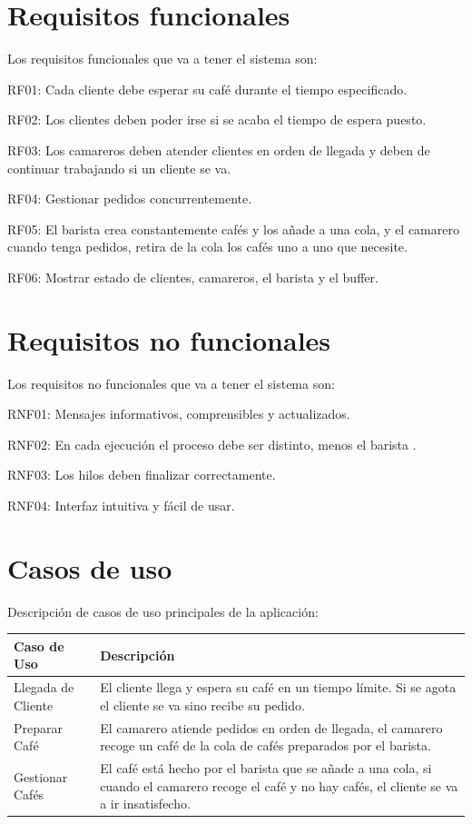 \documentclass[a4paper,12pt]{article}
\begin{document}
\vspace{1cm}
\section{Requisitos funcionales}
Los requisitos funcionales que va a tener el sistema son:

RF01: Cada cliente debe esperar su café durante el tiempo especificado.

RF02: Los clientes deben poder irse si se acaba el tiempo de espera puesto.

RF03: Los camareros deben atender clientes en orden de llegada y deben de continuar trabajando si un cliente se va.

RF04: Gestionar pedidos concurrentemente.

RF05: El barista crea constantemente cafés y los añade a una cola, y el camarero cuando tenga pedidos, retira de la cola los cafés uno a uno que necesite.

RF06: Mostrar estado de clientes, camareros, el barista y el buffer.

\vspace{1cm}
\section{Requisitos no funcionales}
Los requisitos no funcionales que va a tener el sistema son:

RNF01: Mensajes informativos, comprensibles y actualizados.

RNF02: En cada ejecución el proceso debe ser distinto, menos el barista .

RNF03: Los hilos deben finalizar correctamente.

RNF04: Interfaz intuitiva y fácil de usar.

\vspace{2cm}
\section{Casos de uso}
Descripción de casos de uso principales de la aplicación:

\begin{tabular}{|l|p{10cm}|}
    \hline
    Caso de Uso & Descripción \\ \hline
    Llegada de Cliente & El cliente llega y espera su café en un tiempo límite. Si se agota el cliente se va sino recibe su pedido. \\ \hline
    Preparar Café & El camarero atiende pedidos en orden de llegada, el camarero recoge un café de la cola de cafés preparados por el barista. \\ \hline
    Gestionar Cafés & El café está hecho por el barista que se añade a una cola, si cuando el camarero recoge el café y no hay cafés, el cliente se va a ir insatisfecho. \\ \hline
\end{tabular}
\end{document}
